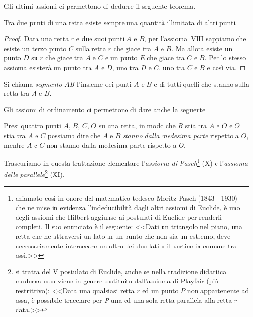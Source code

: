 Gli ultimi assiomi ci permettono di dedurre il seguente teorema.
\begin{teorema}
Tra due punti di una retta esiste sempre una quantità illimitata di 
altri punti.
\end{teorema}
\begin{proof}
Data una retta $r$ e due suoi punti $A$ e $B$, per l'assioma~VIII 
sappiamo che esiste un terzo punto $C$ sulla retta $r$ che giace tra 
$A$ e $B$. Ma allora esiste un punto $D$ su $r$ che giace tra $A$ e 
$C$ e un punto $E$ che giace tra $C$ e $B$. Per lo stesso assioma 
esisterà un punto tra $A$ e $D$, uno tra $D$ e $C$, uno tra $C$ e $B$ 
e così via.
\end{proof}
\begin{center}

\end{center}
\begin{definizione}
Si chiama \emph{segmento} $AB$ l'insieme dei punti $A$ e $B$ e di 
tutti quelli che stanno sulla retta tra $A$ e $B$.
\end{definizione}
Gli assiomi di ordinamento ci permettono di dare anche la seguente

\begin{definizione}
Presi quattro punti $A$, $B$, $C$, $O$ su una retta, in modo che $B$ 
stia tra $A$ e $O$ e $O$ stia tra $A$ e $C$ possiamo dire che $A$ e 
$B$ \emph{stanno dalla medesima parte} rispetto a $O$, mentre $A$ e 
$C$ non stanno dalla medesima parte rispetto a $O$.
\end{definizione}
\begin{center}

\end{center}

\osservazione Trascuriamo in questa trattazione elementare 
l'\emph{assioma di Pasch}\footnote{chiamato così in onore del 
matematico tedesco Moritz Pasch (1843 - 1930) che ne mise in evidenza 
l'indeducibilità dagli altri assiomi di Euclide, è uno degli assiomi 
che Hilbert aggiunse ai postulati di Euclide per renderli completi. 
Il suo enunciato è il seguente: <<Dati un triangolo nel piano, una 
retta che ne attraversi un lato in un punto che non sia un estremo, 
deve necessariamente intersecare un altro dei due lati o il vertice 
in comune tra essi.>>} (X) e l'\emph{assioma delle 
parallele}\footnote{si tratta del V postulato di Euclide, anche se 
nella tradizione didattica moderna esso viene in genere sostituito 
dall'assioma di Playfair (più restrittivo): <<Data una qualsiasi 
retta $r$ ed un punto $P$ non appartenente ad essa, è possibile 
tracciare per $P$ una ed una sola retta parallela alla retta $r$ 
data.>>} (XI).

